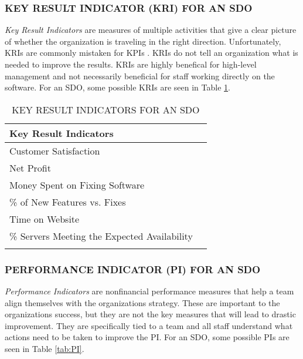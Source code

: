 \documentclass[SDSUThesis.tex]{subfiles}
\begin{document}
        \subsubsection{KEY RESULT INDICATOR (KRI) FOR AN SDO}
            \textit{Key Result Indicators} are measures of multiple
            activities that give a clear picture of whether the
            organization is traveling in the right direction.  Unfortunately,
            KRIs are commonly mistaken for KPIs \cite{parmenter2010}.  KRIs
            do not tell an organization what is needed to improve the 
            results.  KRIs are highly benefical for high-level management
            and not necessarily beneficial for staff working directly on 
            the software.  For
            an SDO, some possible KRIs are seen in Table \ref{tab:KRI}.
            
            \begin{longtable}{@{}l l}
                \toprule%
                 \centering%
                 {\bfseries Key Result Indicators} &
                 \\
                
                \cmidrule[0.4pt](r{0.125em}){1-1}%
                \endhead
                
                Customer Satisfaction  \\
                \myrowcolour%
                Net Profit \\
                Money Spent on Fixing Software \\
                \myrowcolour%
                \% of New Features vs. Fixes \\
                Time on Website \\
                \myrowcolour%
                \% Servers Meeting the Expected Availability \\
                
                \bottomrule
                
                \caption{KEY RESULT INDICATORS FOR AN SDO}
                \label{tab:KRI}
            \end{longtable}
            
        
        \subsubsection{PERFORMANCE INDICATOR (PI) FOR AN SDO}
            \textit{Performance Indicators} are nonfinancial performance measures
            that help a team align themselves with the organizations 
            strategy.  These are important to the organizations success, but
            they are not the key measures that will lead to drastic improvement.  They are specifically tied to a team and all staff understand
            what actions need to be taken to improve the PI.
            For an SDO, some possible PIs are seen in Table \ref{tab:PI}.
                
\end{document}
